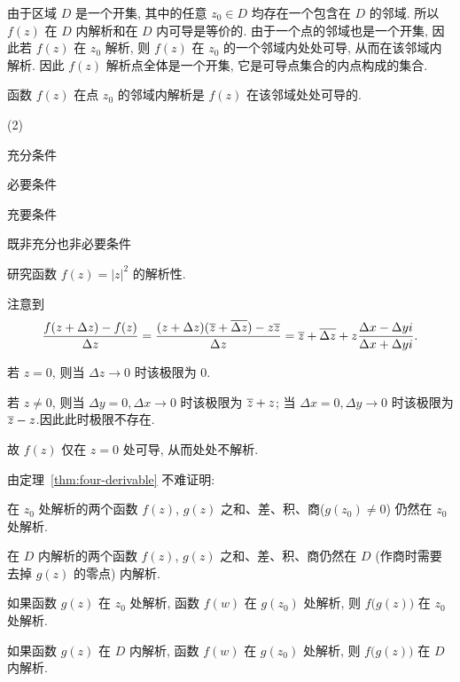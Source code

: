 由于区域 $D$ 是一个开集, 其中的任意 $z_0\in D$ 均存在一个包含在 $D$ 的邻域. 所以 \alert{$f(z)$ 在 $D$ 内解析和在 $D$ 内可导是等价的}.
由于一个点的邻域也是一个开集, 因此若 $f(z)$ 在 $z_0$ 解析, 则 $f(z)$ 在 $z_0$ 的一个邻域内处处可导, 从而在该邻域内解析. 因此 \alert{$f(z)$ 解析点全体是一个开集}, 它是可导点集合的内点构成的集合.

\begin{exercise}
  函数 $f(z)$ 在点 $z_0$ 的邻域内解析是 $f(z)$ 在该邻域处处可导的\fillbrace{}.
  \begin{exchoice}(2)
    \item 充分条件
    \item 必要条件
    \item 充要条件
    \item 既非充分也非必要条件
  \end{exchoice}
\end{exercise}

\begin{example}
  研究函数 $f(z)=|z|^2$ 的解析性.
\end{example}
\begin{solution}
  注意到
  \[
    \frac{f(z+\Delta z)-f(z)}{\Delta z}
    =\frac{(z+\Delta z)(\overline z+\overline{\Delta z})-z\overline z}{\Delta z}
    =\overline z+\overline{\Delta z}+z\frac{\Delta x-\Delta yi}{\Delta x+\Delta yi}.
  \]
  \begin{itempar}
    \item 若 $z=0$, 则当 $\Delta z\to 0$ 时该极限为 $0$.
    \item 若 $z\neq0$, 则当 $\Delta y=0,\Delta x\to 0$ 时该极限为 $\overline z+z$; 当 $\Delta x=0,\Delta y\to 0$ 时该极限为 $\overline z-z$.因此此时极限不存在.
  \end{itempar}

  故 $f(z)$ 仅在 $z=0$ 处可导, 从而处处不解析.
\end{solution}

由定理~\ref{thm:four-derivable} 不难证明:
\begin{theorem}
  \begin{enumpar}
    \item 在 $z_0$ 处解析的两个函数 $f(z)$, $g(z)$ 之和、差、积、商($g(z_0)\neq 0$) 仍然在 $z_0$ 处解析.
    \item 在 $D$ 内解析的两个函数 $f(z)$, $g(z)$ 之和、差、积、商仍然在 $D$ (作商时需要去掉 $g(z)$ 的零点) 内解析.
    \item 如果函数 $g(z)$ 在 $z_0$ 处解析, 函数 $f(w)$ 在 $g(z_0)$ 处解析, 则 $f\bigl(g(z)\bigr)$ 在 $z_0$ 处解析.
    \item 如果函数 $g(z)$ 在 $D$ 内解析, 函数 $f(w)$ 在 $g(z_0)$ 处解析, 则 $f\bigl(g(z)\bigr)$ 在 $D$ 内解析.
  \end{enumpar}
\end{theorem}


